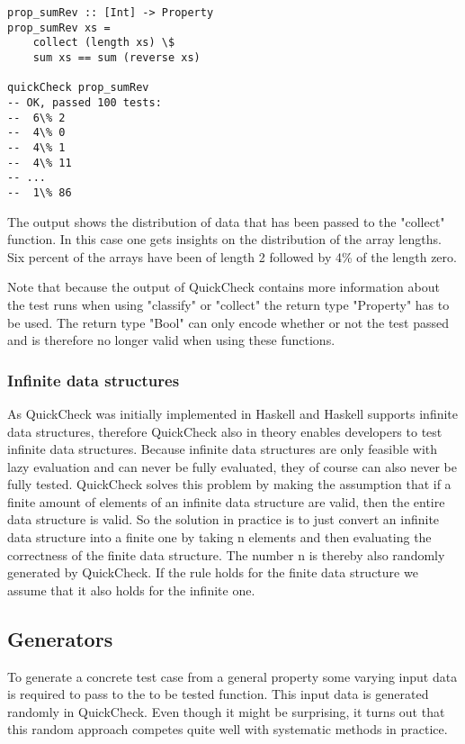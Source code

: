 \documentclass[a4paper, 12pt]{article} %
\begin{document}
\begin{verbatim}
prop_sumRev :: [Int] -> Property
prop_sumRev xs = 
    collect (length xs) \$
    sum xs == sum (reverse xs)

quickCheck prop_sumRev
-- OK, passed 100 tests:
--  6\% 2 
--  4\% 0 
--  4\% 1 
--  4\% 11 
-- ... 
--  1\% 86 
\end{verbatim}

The output shows the distribution of data that has been passed to the "collect" function. In this case one gets insights on the distribution of the array lengths. Six percent of the arrays have been of length 2 followed by 4\% of the length zero.

Note that because the output of QuickCheck contains more information about the test runs when using "classify" or "collect" the return type "Property" has to be used. The return type "Bool" can only encode whether or not the test passed and is therefore no longer valid when using these functions. 

\subsubsection{Infinite data structures}

As QuickCheck was initially implemented in Haskell and Haskell supports infinite data structures, therefore QuickCheck also in theory enables developers to test infinite data structures. Because infinite data structures are only feasible with lazy evaluation and can never be fully evaluated, they of course can also never be fully tested. QuickCheck solves this problem by making the assumption that if a finite amount of elements of an infinite data structure are valid, then the entire data structure is valid. So the solution in practice is to just convert an infinite data structure into a finite one by taking n elements and then evaluating the correctness of the finite data structure. The number n is thereby also randomly generated by QuickCheck. If the rule holds for the finite data structure we assume that it also holds for the infinite one. \cite{Claessen2000}

\subsection{Generators}

To generate a concrete test case from a general property some varying input data is required to pass to the to be tested function. This input data is generated randomly in QuickCheck. Even though it might be surprising, it turns out that this random approach competes quite well with systematic methods in practice. \cite{Claessen2000}
\end{document}
